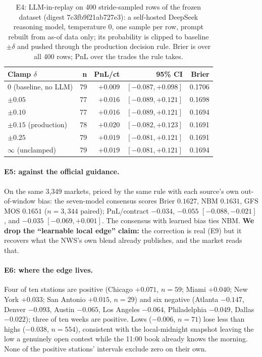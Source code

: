 \documentclass[sigconf,review,anonymous]{acmart}
\begin{document}
\begin{table}[t]
\centering
\small
\begin{tabular}{@{}lrrrr@{}}
\toprule
\textbf{Clamp $\delta$} & \textbf{n} & \textbf{PnL/ct} & \textbf{95\% CI} & \textbf{Brier} \\
\midrule
0 (baseline, no LLM) & 79 & $+0.009$ & $[-0.087, +0.098]$ & 0.1706 \\
$\pm 0.05$ & 77 & $+0.016$ & $[-0.089, +0.121]$ & 0.1698 \\
$\pm 0.10$ & 77 & $+0.016$ & $[-0.089, +0.121]$ & 0.1694 \\
$\pm 0.15$ (production) & 78 & $+0.020$ & $[-0.082, +0.123]$ & 0.1691 \\
$\pm 0.25$ & 79 & $+0.019$ & $[-0.081, +0.121]$ & 0.1691 \\
$\infty$ (unclamped) & 79 & $+0.019$ & $[-0.081, +0.121]$ & 0.1694 \\
\bottomrule
\end{tabular}
\caption{E4: LLM-in-replay on 400 stride-sampled rows of the frozen dataset
(digest 7c3fb9f21ab727e3): a self-hosted DeepSeek reasoning model, temperature
0, one sample per row, prompt rebuilt from as-of data only; its probability is
clipped to baseline $\pm\delta$ and pushed through the production decision
rule. Brier is over all 400 rows; PnL over the trades the rule takes.}
\label{tab:llm}
\end{table}

\paragraph{E5: against the official guidance.} On the same 3{,}349 markets,
priced by the same rule with each source's own out-of-window bias: the
seven-model consensus scores Brier $0.1627$, NBM $0.1631$, GFS MOS $0.1651$
($n=3{,}344$ paired); PnL/contract $-0.034$, $-0.055$ $[-0.088, -0.021]$, and
$-0.035$ $[-0.069, +0.001]$. The consensus with learned bias ties NBM.
\textbf{We drop the ``learnable local edge'' claim:} the correction is real
(E9) but it recovers what the NWS's own blend already publishes, and the
market reads that.

\paragraph{E6: where the edge lives.} Four of ten stations are positive
(Chicago $+0.071$, $n=59$; Miami $+0.040$; New York $+0.033$; San Antonio
$+0.015$, $n=29$) and six negative (Atlanta $-0.147$, Denver $-0.093$, Austin
$-0.065$, Los Angeles $-0.064$, Philadelphia $-0.049$, Dallas $-0.022$); three
of ten weeks are positive. Lows ($-0.006$, $n=71$) lose less than highs
($-0.038$, $n=554$), consistent with the local-midnight snapshot leaving the
low a genuinely open contest while the 11:00 book already knows the morning.
None of the positive stations' intervals exclude zero on their own.
\end{document}

